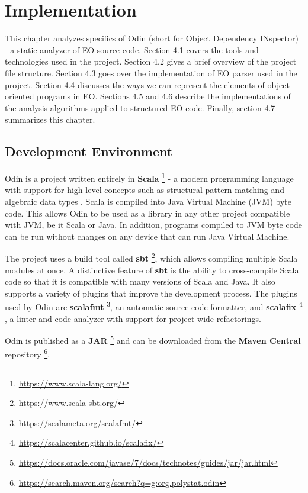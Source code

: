 \chapter{Implementation}
\label{chap:impl}
This chapter analyzes specifics of Odin (short for Object Dependency INspector) - a static analyzer of EO source code. Section 4.1 covers the tools and technologies used in the project. Section 4.2 gives a brief overview of the project file structure.
Section 4.3 goes over the implementation of EO parser used in the project. Section 4.4 discusses the ways we can represent the elements of object-oriented programs in EO. Sections 4.5 and 4.6 describe the implementations of the analysis algorithms applied to structured EO code. Finally, section 4.7 summarizes this chapter.

\section{Development Environment}
Odin is a project written entirely in \textbf{Scala} \footnote{\url{https://www.scala-lang.org/}} - a modern programming language with support for high-level concepts such as structural pattern matching \cite{pattern_matching} and algebraic data types \cite{adts}. Scala is compiled into Java Virtual Machine (JVM) byte code. This allows Odin to be used as a library in any other project compatible with JVM, be it Scala or Java. In addition, programs compiled to JVM byte code can be run without changes on any device that can run Java Virtual Machine.


The project uses a build tool called \textbf{sbt} \footnote{\url{https://www.scala-sbt.org/}}, which allows compiling multiple Scala modules at once. A distinctive feature of \textbf{sbt} is the ability to cross-compile Scala code so that it is compatible with many versions of Scala and Java. It also supports a variety of plugins that improve the development process. The plugins used by Odin are \textbf{scalafmt} \footnote{\url{https://scalameta.org/scalafmt/}}, an automatic source code formatter, and \textbf{scalafix} \footnote{\url{https://scalacenter.github.io/scalafix/}} , a linter and code analyzer with support for project-wide refactorings.

Odin is published as a \textbf{JAR} \footnote{\url{https://docs.oracle.com/javase/7/docs/technotes/guides/jar/jar.html}} and can be downloaded from the \textbf{Maven Central} repository \footnote{\url{https://search.maven.org/search?q=g:org.polystat.odin}}.

